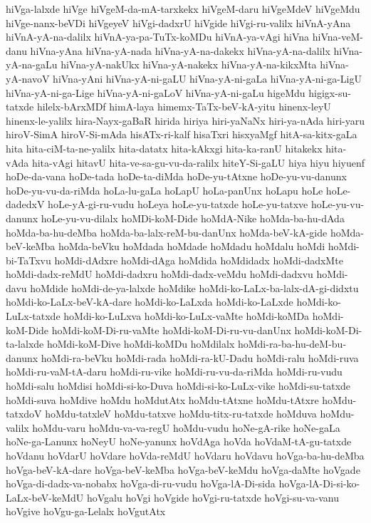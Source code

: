 {hiVga-lalxde
hiVge
hiVgeM-da-mA-tarxkekx
hiVgeM-daru
hiVgeMdeV
hiVgeMdu
hiVge-nanx-beVDi
hiVgeyeV
hiVgi-dadxrU
hiVgide
hiVgi-ru-valilx
hiVnA-yAna
hiVnA-yA-na-dalilx
hiVnA-ya-pa-TuTx-koMDu
hiVnA-ya-vAgi
hiVna
hiVna-veM-danu
hiVna-yAna
hiVna-yA-nada
hiVna-yA-na-dakekx
hiVna-yA-na-dalilx
hiVna-yA-na-gaLu
hiVna-yA-nakUkx
hiVna-yA-nakekx
hiVna-yA-na-kikxMta
hiVna-yA-navoV
hiVna-yAni
hiVna-yA-ni-gaLU
hiVna-yA-ni-gaLa
hiVna-yA-ni-ga-LigU
hiVna-yA-ni-ga-Lige
hiVna-yA-ni-gaLoV
hiVna-yA-ni-gaLu
higeMdu
higigx-su-tatxde
hilelx-bArxMDf
himA-laya
himemx-TaTx-beV-kA-yitu
hinenx-leyU
hinenx-le-yalilx
hira-Nayx-gaBaR
hirida
hiriya
hiri-yaNaNx
hiri-ya-nAda
hiri-yaru
hiroV-SimA
hiroV-Si-mAda
hisATx-ri-kalf
hisaTxri
hisxyaMgf
hitA-sa-kitx-gaLa
hita
hita-ciM-ta-ne-yalilx
hita-datatx
hita-kAkxgi
hita-ka-ranU
hitakekx
hita-vAda
hita-vAgi
hitavU
hita-ve-sa-gu-vu-da-ralilx
hiteY-Si-gaLU
hiya
hiyu
hiyuenf
hoDe-da-vana
hoDe-tada
hoDe-ta-diMda
hoDe-yu-tAtxne
hoDe-yu-vu-danunx
hoDe-yu-vu-da-riMda
hoLa-lu-gaLa
hoLapU
hoLa-panUnx
hoLapu
hoLe
hoLe-dadedxV
hoLe-yA-gi-ru-vudu
hoLeya
hoLe-yu-tatxde
hoLe-yu-tatxve
hoLe-yu-vu-danunx
hoLe-yu-vu-dilalx
hoMDi-koM-Dide
hoMdA-Nike
hoMda-ba-hu-dAda
hoMda-ba-hu-deMba
hoMda-ba-lalx-reM-bu-danUnx
hoMda-beV-kA-gide
hoMda-beV-keMba
hoMda-beVku
hoMdada
hoMdade
hoMdadu
hoMdalu
hoMdi
hoMdi-bi-TaTxvu
hoMdi-dAdxre
hoMdi-dAga
hoMdida
hoMdidadx
hoMdi-dadxMte
hoMdi-dadx-reMdU
hoMdi-dadxru
hoMdi-dadx-veMdu
hoMdi-dadxvu
hoMdi-davu
hoMdide
hoMdi-de-ya-lalxde
hoMdike
hoMdi-ko-LaLx-ba-lalx-dA-gi-didxtu
hoMdi-ko-LaLx-beV-kA-dare
hoMdi-ko-LaLxda
hoMdi-ko-LaLxde
hoMdi-ko-LuLx-tatxde
hoMdi-ko-LuLxva
hoMdi-ko-LuLx-vaMte
hoMdi-koMDa
hoMdi-koM-Dide
hoMdi-koM-Di-ru-vaMte
hoMdi-koM-Di-ru-vu-danUnx
hoMdi-koM-Di-ta-lalxde
hoMdi-koM-Dive
hoMdi-koMDu
hoMdilalx
hoMdi-ra-ba-hu-deM-bu-danunx
hoMdi-ra-beVku
hoMdi-rada
hoMdi-ra-kU-Dadu
hoMdi-ralu
hoMdi-ruva
hoMdi-ru-vaM-tA-daru
hoMdi-ru-vike
hoMdi-ru-vu-da-riMda
hoMdi-ru-vudu
hoMdi-salu
hoMdisi
hoMdi-si-ko-Duva
hoMdi-si-ko-LuLx-vike
hoMdi-su-tatxde
hoMdi-suva
hoMdive
hoMdu
hoMdutAtx
hoMdu-tAtxne
hoMdu-tAtxre
hoMdu-tatxdoV
hoMdu-tatxleV
hoMdu-tatxve
hoMdu-titx-ru-tatxde
hoMduva
hoMdu-valilx
hoMdu-varu
hoMdu-va-va-regU
hoMdu-vudu
hoNe-gA-rike
hoNe-gaLa
hoNe-ga-Lanunx
hoNeyU
hoNe-yanunx
hoVdAga
hoVda
hoVdaM-tA-gu-tatxde
hoVdanu
hoVdarU
hoVdare
hoVda-reMdU
hoVdaru
hoVdavu
hoVga-ba-hu-deMba
hoVga-beV-kA-dare
hoVga-beV-keMba
hoVga-beV-keMdu
hoVga-daMte
hoVgade
hoVga-di-dadx-va-nobabx
hoVga-di-ru-vudu
hoVga-lA-Di-sida
hoVga-lA-Di-si-ko-LaLx-beV-keMdU
hoVgalu
hoVgi
hoVgide
hoVgi-ru-tatxde
hoVgi-su-va-vanu
hoVgive
hoVgu-ga-Lelalx
hoVgutAtx
}
